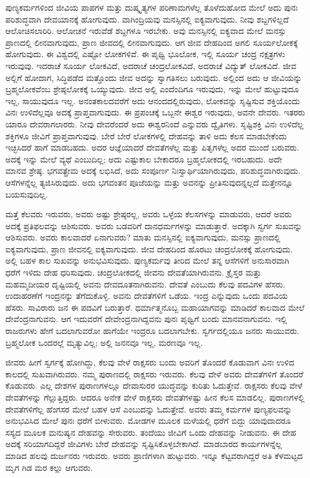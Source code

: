 ಪುಣ್ಯಕರ್ಮಗಳಿಂದ ಜೀವಿಯ ಪಾಪಗಳ ಮತ್ತು ದುಷ್ಕೃತ್ಯಗಳ ಪರಿಣಾಮಗಳೆಲ್ಲ ತೊಳೆದುಹೋದ ಮೇಲೆ ಅದು ಪುನಃ ಪರಿಶುದ್ಧವಾಗಿ ದೇವಯಾನಕ್ಕೆ ಹೋಗುವುದು. ವಾಗಿಂದ್ರಿಯವು ಮನಸ್ಸಿನಲ್ಲಿ ಐಕ್ಯವಾಗುವುದು. ನೀವು ಶಬ್ದಗಳಿಲ್ಲದೆ ಆಲೋಚಿಸಲಾರಿರಿ. ಆಲೋಚನೆ ಇರುವೆಡೆ ಶಬ್ದಗಳೂ ಇರಬೇಕು. ಅವು ಮನಸ್ಸಿನಲ್ಲಿ ಐಕ್ಯವಾದ ಮೇಲೆ ಮನಸ್ಸು ಪ್ರಾಣದಲ್ಲಿ ಲೀನವಾಗುವುದು, ಪ್ರಾಣ ಜೀವದಲ್ಲಿ ಲೀನವಾಗುವುದು. ಆಗ ಜೀವ ದೇಹದಿಂದ ಅಗಲಿ ಸೂರ್ಯಲೋಕಕ್ಕೆ ಹೋಗುವುದು. ಈ ವಿಶ್ವದಲ್ಲಿ ಎಷ್ಟೋ ಲೋಕಗಳಿವೆ. ಈ ಪೃಥ್ವಿ ಭೂಲೋಕ, ಇಲ್ಲಿ ಸೂರ್ಯ ಚಂದ್ರ ನಕ್ಷತ್ರಗಳು ಇರುವುವು. ಇದರಾಚೆ ಸೂರ್ಯ ಲೋಕವಿದೆ, ಅದರಾಚೆ ಚಂದ್ರಲೋಕವಿದೆ, ಅದರಾಚೆ ವಿದ್ಯುತ್​ ಲೋಕವಿದೆ. ಜೀವ ಅಲ್ಲಿಗೆ ಹೋದಾಗ, ಸಿದ್ಧಿಪಡೆದ ಮತ್ತೊಂದು ಜೀವ ಅದನ್ನು ಸ್ವಾಗತಿಸಲು ಬರುವುದು. ಅಲ್ಲಿಂದ ಅದು ಆ ಜೀವಿಯನ್ನು ಬ್ರಹ್ಮಲೋಕವೆಂಬ ಶ್ರೇಷ್ಠಲೋಕಕ್ಕೆ ಒಯ್ಯುವುದು. ಜೀವ ಅಲ್ಲಿ ಎಂದೆಂದಿಗೂ ಇರುವುದು, ಇನ್ನು ಮೇಲೆ ಹುಟ್ಟುವುದೂ ಇಲ್ಲ, ಸಾಯುವುದೂ ಇಲ್ಲ. ಅನಂತಕಾಲದವರೆಗೆ ಅದು ಆನಂದದಲ್ಲಿರುವುದು, ಲೋಕವನ್ನು ಸೃಷ್ಟಿಸುವ ಶಕ್ತಿಯೊಂದು ವಿನಃ ಉಳಿದೆಲ್ಲವೂ ಅದಕ್ಕೆ ಪ್ರಾಪ್ತವಾಗುವುದು. ಈ ಪ್ರಪಂಚಕ್ಕೆ ಒಬ್ಬನೇ ಈಶ್ವರ ಇರುವುದು, ಅವನೇ ದೇವರು. ಇತರರು ಯಾರೂ ದೇವರಾಗಲಾರರು. ನೀವು ದೇವರೆಂದರೆ ಅದು ಈಶ್ವರನಿಂದೆ ಎನ್ನುವರು ದ್ವೈತಿಗಳು. ಸೃಷ್ಟಿಶಕ್ತಿ ವಿನಃ ಉಳಿದೆಲ್ಲ ಶಕ್ತಿಗಳೂ ಜೀವಿಗೆ ಪ್ರಾಪ್ತವಾಗುವುವು. ಬೇರೆ ಬೇರೆ ಲೋಕಗಳಲ್ಲಿ ದೇಹವನ್ನು ತಾಳಿ ಅದು ಕೆಲಸ ಮಾಡಬೇಕೆಂದು ಇಚ್ಛಿಸಿದರೆ ಹಾಗೆ ಮಾಡಬಹದು. ಅದರ ಆಜ್ಞೆಯಾದರೆ ದೇವತೆಗಳೆಲ್ಲ ಮತ್ತು ಪಿತೃಗಳೆಲ್ಲ ಅದರ ಮುಂದೆ ಬರುವರು. ಅದಕ್ಕೆ ಇನ್ನು ಮೇಲೆ ವ್ಯಥೆ ಎಂಬುದಿಲ್ಲ; ಅದು ಎಷ್ಟುಕಾಲ ಬೇಕಾದರೂ ಬ್ರಹ್ಮಲೋಕದಲ್ಲಿ ಇರಬಹುದು. ಅದೇ ಮಾನವ ಶ್ರೇಷ್ಠ. ಭಗವತ್ಪ್ರೇಮ ಅದಕ್ಕೆ ಲಭಿಸಿದೆ, ಅದು ಸಂಪೂರ್ಣ ನಿಃಸ್ವಾರ್ಥಿಯಾಗಿರುವುದು, ಪರಿಶುದ್ಧವಾಗಿರುವುದು. ಆಸೆಗಳನ್ನೆಲ್ಲ ತ್ಯಜಿಸಿರುವುದು. ಅದು ಭಗವಂತನ ಪೂಜೆಯನ್ನು ಮತ್ತು ಅವನನ್ನು ಪ್ರೀತಿಸುವುದನ್ನಲ್ಲದೆ ಮತ್ತೇನನ್ನೂ ಬಯಸುವುದಿಲ್ಲ.

ಮತ್ತೆ ಕೆಲವರು ಇರುವರು, ಅವರು ಅಷ್ಟು ಶ್ರೇಷ್ಠರಲ್ಲ, ಅವರು ಒಳ್ಳೆಯ ಕೆಲಸಗಳನ್ನು ಮಾಡುವರು, ಆದರೆ ಅವರು ಅದಕ್ಕೆ ಪ್ರತಿಫಲವನ್ನು ಆಶಿಸುವರು. ಅವರು ಬಡವರಿಗೆ ದಾನಧರ್ಮಗಳನ್ನು ಮಾಡುತ್ತಾರೆ. ಅದಕ್ಕಾಗಿ ಸ್ವರ್ಗ ಸುಖವನ್ನು ಆಶಿಸುವರು. ಅವರು ಕಾಲವಾದರೆ ಏನಾಗುವರು? ಮಾತು ಮನಸ್ಸಿನಲ್ಲಿ ಐಕ್ಯವಾಗುವುದು, ಮನಸ್ಸು ಪ್ರಾಣದಲ್ಲಿ ಐಕ್ಯವಾಗುವುದು, ಪ್ರಾಣ ಜೀವನಲ್ಲಿ ಐಕ್ಯವಾಗುವುದು. ಜೀವ ದೇಹದಿಂದ ಹೊರಟು ಚಂದ್ರಲೋಕಕ್ಕೆ ಹೋಗುವುದು. ಅಲ್ಲಿ ಬಹಳ ಕಾಲ ಸುಖವನ್ನು ಅನುಭವಿಸುವುದು. ಪುಣ್ಯಕರ್ಮವು ತೀರಿದ ಮೇಲೆ ತನ್ನ ಆಸೆಗಳಿಗೆ ಅನುಸಾರವಾಗಿ ಧರೆಗೆ ಇಳಿದು ದೇಹ ಧರಿಸುವುದು. ಚಂದ್ರಲೋಕದಲ್ಲಿ ಜೀವನು ದೇವತೆಯಾಗಿರುವನು. ಕ್ರೈಸ್ತರ ಮತ್ತು ಮಹಮ್ಮದೀಯರ ದೃಷ್ಟಿಯಲ್ಲಿ ಅವನು ದೇವದೂತನಾಗಿರುವನು. ದೇವತೆ ಎಂಬುದು ಕೆಲವು ಪದವಿಗಳ ಹೆಸರು. ಉದಾಹರಣೆಗೆ ಇಂದ್ರನನ್ನು ತೆಗೆದುಕೊಳ್ಳಿ. ಅವನು ದೇವತೆಗಳಿಗೆ ಒಡೆಯ. ಇಂದ್ರ ಎನ್ನುವುದು ಒಂದು ಪದವಿಯ ಹೆಸರು. ಸಾವಿರಾರು ಜನ ಈ ಪದವಿಗೆ ಬರುತ್ತಾರೆ. ಧರ್ಮಾತ್ಮನೊಬ್ಬ ಮಹಾಯಾಗವನ್ನು ಮಾಡಿದರೆ ಕಾಲವಾದ ಮೇಲೆ ದೇವೆಂದ್ರನಾಗುವನು. ಆಗ ಇದುವರೆಗೆ ದೇವೇಂದ್ರನಾಗಿದ್ದವನು ಪುನಃ ಪೃಥ್ವಿಗೆ ಬಂದು ಮಾನವನಾಗುವನು. ಇಲ್ಲಿ ರಾಜರುಗಳು ಹೇಗೆ ಬದಲಾಗುವರೋ ಹಾಗೆಯೇ ಇಂದ್ರರೂ ಬದಲಾಗಬೇಕು. ಸ್ವರ್ಗದಲ್ಲಿಯೂ ಜನರು ಸಾಯುವರು. ಬ್ರಹ್ಮಲೋಕ ಒಂದರಲ್ಲೆ ಮೃತ್ಯುವಿಲ್ಲ; ಅಲ್ಲಿ ಜನನವೂ ಇಲ್ಲ, ಮರಣವೂ ಇಲ್ಲ.

ಜೀವರು ಹೀಗೆ ಸ್ವರ್ಗಕ್ಕೆ ಹೋಗಿದ್ದು, ಕೆಲವು ವೇಳೆ ರಾಕ್ಷಸರು ಬಂದು ಅವರಿಗೆ ತೊಂದರೆ ಕೊಡುವಾಗ ವಿನಃ ಉಳಿದ ಕಾಲದಲ್ಲಿ ಸುಖವಾಗಿರುವರು. ನಮ್ಮ ಪುರಾಣದಲ್ಲಿ ರಾಕ್ಷಸರು ಇರುವರು. ಕೆಲವು ವೇಳೆ ಅವರು ದೇವತೆಗಳಿಗೆ ತೊಂದರೆ ಕೊಡುವರು. ಎಲ್ಲ ದೇಶಗಳ ಪುರಾಣಗಳಲ್ಲೂ ದೇವಾಸುರರ ಯುದ್ಧವನ್ನು ಕುರಿತು ಓದುತ್ತೇವೆ. ರಾಕ್ಷಸರು ಕೆಲವು ವೇಳೆ ದೇವತೆಗಳನ್ನು ಗೆಲ್ಲುತ್ತಿದ್ದರು. ಆದರೂ ಅನೇಕ ವೇಳೆ ರಾಕ್ಷಸರು ದೇವತೆಗಳಷ್ಟು ಹೀನ ಕೆಲಸ ಮಾಡಲಿಲ್ಲ. ಪುರಾಣಗಳಲ್ಲಿ ದೇವತೆಗಳಿಗೆಲ್ಲ ಹೆಂಗಸರ ಮೇಲೆ ಬಹಳ ಆಸೆ ಎಂಬುದನ್ನು ಓದುತ್ತೇವೆ. ಅವರು ತಮ್ಮ ಕರ್ಮಗಳ ಪುಣ್ಯಫಲವನ್ನು ಅನುಭವಿಸಿದ ಮೇಲೆ ಪುನಃ ಧರೆಗೆ ಬೀಳುವರು. ಮೋಡಗಳ ಮೂಲಕ ಮಳೆಯಲ್ಲಿ ಧರೆಗೆ ಬಿದ್ದು ಯಾವುದಾದರೂ ಸಸ್ಯದ ಮೂಲಕ ಮನುಷ್ಯನ ದೇಹವನ್ನು ಸೇರುವರು. ತಂದೆಯು ಜೀವಿಗೆ ಒಂದು ದೇಹವನ್ನು ನೀಡುವನು. ಈ ದೇಹ ಅದಕ್ಕೆ ಸರಿಯಾಗದಿದ್ದರೆ ಜೀವಿಗಳು ಬೇರೆ ದೇಹವನ್ನು ಸೃಷ್ಟಿಸಿಕೊಳ್ಳಬೇಕಾಗಿದೆ. ಮಾಡಬಾರದ ಕಾರ್ಯಗಳನ್ನೆಲ್ಲ ಮಾಡಿದ ಹಲವು ದುರ್ಜನರು ಇರುವರು. ಅವರು ಪ್ರಾಣಿಗಳಾಗಿ ಹುಟ್ಟುವರು. ಇನ್ನೂ ಕೆಟ್ಟವರಾಗಿದ್ದರೆ ಅತಿ ಕೆಳಮಟ್ಟದ ಮೃಗ ಗಿಡ ಮರ ಕಲ್ಲು ಆಗುವರು.

